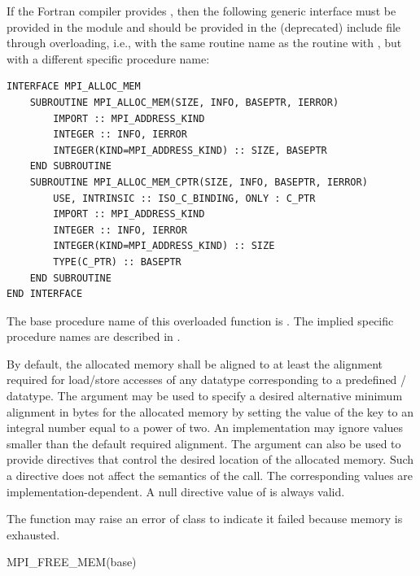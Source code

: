 If the Fortran compiler provides , 
then the following generic interface must be provided in the 
module and should be provided in the (deprecated)  include file through overloading, 
i.e., with the same routine name as the
routine with  , 
but with a different specific procedure name:

\begin{verbatim}
INTERFACE MPI_ALLOC_MEM
    SUBROUTINE MPI_ALLOC_MEM(SIZE, INFO, BASEPTR, IERROR)
        IMPORT :: MPI_ADDRESS_KIND
        INTEGER :: INFO, IERROR
        INTEGER(KIND=MPI_ADDRESS_KIND) :: SIZE, BASEPTR
    END SUBROUTINE
    SUBROUTINE MPI_ALLOC_MEM_CPTR(SIZE, INFO, BASEPTR, IERROR)
        USE, INTRINSIC :: ISO_C_BINDING, ONLY : C_PTR
        IMPORT :: MPI_ADDRESS_KIND
        INTEGER :: INFO, IERROR
        INTEGER(KIND=MPI_ADDRESS_KIND) :: SIZE
        TYPE(C_PTR) :: BASEPTR
    END SUBROUTINE
END INTERFACE
\end{verbatim}
 
The base procedure name of this overloaded function is . The implied specific procedure names
are described in .

By default, the allocated memory shall be aligned to at least the alignment
required for load/store accesses of any datatype corresponding to a
predefined \MPI/ datatype.
%
The  argument may be used to specify a desired alternative minimum alignment in bytes for the
allocated memory by setting the value of the key  to an integral number
equal to a power of two.
An implementation may ignore values smaller than the default required alignment.
The  argument can also be used to provide
directives that control the desired location of the allocated memory.
Such a directive does not affect the semantics of the call.
The corresponding  values are
implementation-dependent. A null directive value of
\mpicode{ = } is always valid.

The  function  may raise an error of class
to indicate it failed because memory 
is exhausted.

\begin{funcdef}{MPI\_FREE\_MEM}{(\mbox{base})}
\end{funcdef}

